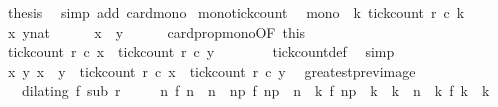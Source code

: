 \begin{isabellebody}
\ {\isacharquery}thesis\ \isamarkupfalse%
\ {\isacharparenleft}simp\ add{\isacharcolon}\ card{\isacharunderscore}mono{\isacharparenright}\isanewline
{}\isamarkupfalse%
%
\endisatagproof
{\isafoldproof}%
%
\isadelimproof
\isanewline
%
\endisadelimproof
\isanewline
{}\isamarkupfalse%
\ mono{\isacharunderscore}tick{\isacharunderscore}count{\isacharcolon}\isanewline
\ \ {\isacartoucheopen}mono\ {\isacharparenleft}{\isasymlambda}\ k{\isachardot}\ tick{\isacharunderscore}count\ r\ c\ k{\isacharparenright}{\isacartoucheclose}\isanewline
%
\isadelimproof
%
\endisadelimproof
%
\isatagproof
{}\isamarkupfalse%
\isanewline
\ \ \isacommand{{\isacharbraceleft}}\isamarkupfalse%
\ \isamarkupfalse%
\ x\ y{\isacharcolon}{\isacharcolon}nat\isanewline
\ \ \ \ \isamarkupfalse%
\ {\isacartoucheopen}x\ {\isasymle}\ y{\isacartoucheclose}\isanewline
\ \ \ \ \isamarkupfalse%
\ card{\isacharunderscore}prop{\isacharunderscore}mono{\isacharbrackleft}OF\ this{\isacharbrackright}\ \isamarkupfalse%
\ {\isacartoucheopen}tick{\isacharunderscore}count\ r\ c\ x\ {\isasymle}\ tick{\isacharunderscore}count\ r\ c\ y{\isacartoucheclose}\isanewline
\ \ \ \ \ \ \isamarkupfalse%
\ tick{\isacharunderscore}count{\isacharunderscore}def\ \isamarkupfalse%
\ simp\isanewline
\ \ \isacommand{{\isacharbraceright}}\isamarkupfalse%
\ \isamarkupfalse%
\ {\isacartoucheopen}{\isasymAnd}x\ y{\isachardot}\ x\ {\isasymle}\ y\ {\isasymLongrightarrow}\ tick{\isacharunderscore}count\ r\ c\ x\ {\isasymle}\ tick{\isacharunderscore}count\ r\ c\ y{\isacartoucheclose}\ \isacommand{{\isachardot}}\isamarkupfalse%
\isanewline
{}\isamarkupfalse%
%
\endisatagproof
{\isafoldproof}%
%
\isadelimproof
\isanewline
%
\endisadelimproof
\isanewline
{}\isamarkupfalse%
\ greatest{\isacharunderscore}prev{\isacharunderscore}image{\isacharcolon}\isanewline
\ \ \ {\isacartoucheopen}dilating\ f\ sub\ r{\isacartoucheclose}\isanewline
\ \ \ \ \ {\isacartoucheopen}{\isacharparenleft}{\isasymnexists}n\ f\ n\ {\isacharequal}\ n{\isacharparenright}\ {\isasymLongrightarrow}\ {\isacharparenleft}{\isasymexists}n\isactrlsub p{\isachardot}\ f\ n\isactrlsub p\ {\isacharless}\ n\ {\isasymand}\ {\isacharparenleft}{\isasymforall}k{\isachardot}\ f\ n\isactrlsub p\ {\isacharless}\ k\ {\isasymand}\ k\ {\isasymle}\ n\ {\isasymlongrightarrow}\ {\isacharparenleft}{\isasymnexists}k\ f\ k\ {\isacharequal}\ k{\isacharparenright}{\isacharparenright}{\isacharparenright}{\isacartoucheclose}\isanewline

\end{isabellebody}
